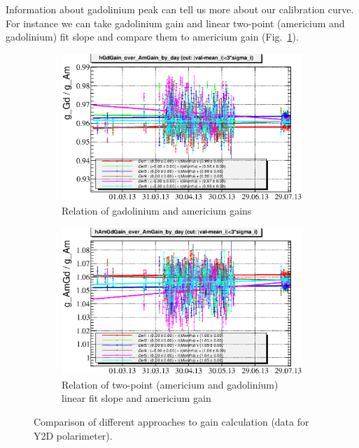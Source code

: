 \documentclass[a4paper]{article}
\begin{document}
Information about gadolinium peak can tell us more about our calibration curve.
For instance we can take gadolinium gain and linear two-point (americium and gadolinium) fit slope
 and compare them to americium gain (Fig.~\ref{fig:gain_relations}).

\begin{figure}[p]
\begin{subfigure}[b]{0.5\textwidth}
\includegraphics[width=\textwidth]{gfx/run13_alpha_study/Y2U/c_chGdGain_over_AmGain_by_day_Y2U.eps}
\caption{Relation of gadolinium and americium gains}
\end{subfigure}
\begin{subfigure}[b]{0.5\textwidth}
\includegraphics[width=\textwidth]{gfx/run13_alpha_study/Y2U/c_chAmGdGain_over_AmGain_by_day_Y2U.eps}
\caption{Relation of two-point (americium and gadolinium) linear fit slope and americium gain}
\end{subfigure}
\caption{Comparison of different approaches to gain calculation (data for Y2D polarimeter).}
\label{fig:gain_relations}
\end{figure}
\end{document}
